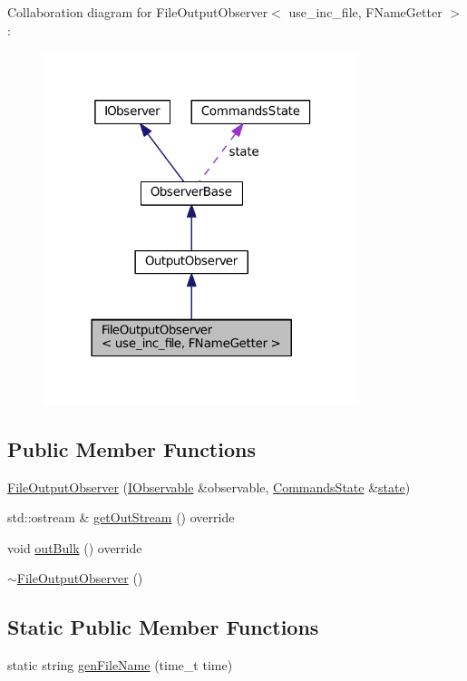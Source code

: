 Collaboration diagram for File\+Output\+Observer$<$ use\+\_\+inc\+\_\+file, F\+Name\+Getter $>$\+:
\nopagebreak
\begin{figure}[H]
\begin{center}
\leavevmode
\includegraphics[width=261pt]{struct_file_output_observer__coll__graph}
\end{center}
\end{figure}
\subsection*{Public Member Functions}
\begin{DoxyCompactItemize}
\item 
\hyperlink{struct_file_output_observer_aa4fba0db9135440d1839b78cf3f5d6f2}{File\+Output\+Observer} (\hyperlink{struct_i_observable}{I\+Observable} \&observable, \hyperlink{class_commands_state}{Commands\+State} \&\hyperlink{struct_observer_base_a107ad54040309605fa5fafd481b97f2f}{state})
\item 
std\+::ostream \& \hyperlink{struct_file_output_observer_a29e2740fee9602d0c6ebcb2fe44d2060}{get\+Out\+Stream} () override
\item 
void \hyperlink{struct_file_output_observer_a818d1d56e2495ecfa79a50297a0639ce}{out\+Bulk} () override
\item 
\hyperlink{struct_file_output_observer_ab1ce3fa7b827c1cc13aa231be7612e72}{$\sim$\+File\+Output\+Observer} ()
\end{DoxyCompactItemize}
\subsection*{Static Public Member Functions}
\begin{DoxyCompactItemize}
\item 
static string \hyperlink{struct_file_output_observer_a2fa43d18e8535b246ad2167c3dbd7eaa}{gen\+File\+Name} (time\+\_\+t time)
\end{DoxyCompactItemize}
